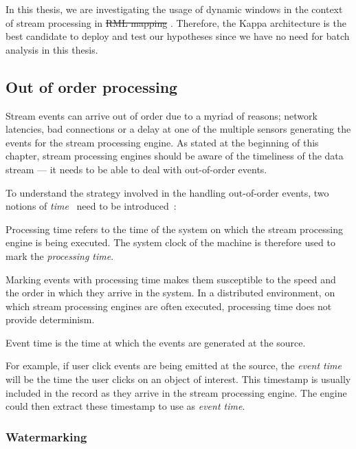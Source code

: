 In this thesis, we are investigating the usage of dynamic windows in the context of stream processing 
in \sout{RML mapping} . 
Therefore, the Kappa architecture is the best candidate to deploy and test our 
hypotheses since we have no need for batch analysis in this thesis.  

\subsection{Out of order processing}%
\label{sub:Out of order processing}
Stream events can arrive out of order due to a myriad of reasons; network latencies, 
bad connections or a delay at one of the multiple sensors generating the events for 
the stream processing engine. As stated at the beginning of this chapter, stream 
processing engines should be aware of the timeliness of the data stream --- it needs 
to be able to deal with out-of-order events. 

To understand the strategy involved in the handling out-of-order events, 
two notions of \emph{time}~ need to be introduced~\cite{watermark_flink}:  

\begin{defn}
    Processing time refers to the time of the system on which the stream processing 
    engine is being executed. The system clock of the machine is therefore used 
    to mark the \emph{processing time}. 
\end{defn}
Marking events with processing time makes them 
susceptible to the speed and the order in which they arrive in the system. 
In a distributed environment, on which stream processing engines are often 
executed, processing time does not provide determinism.


\begin{defn}
    Event time is the time at which the events are generated at the source.
\end{defn}
For example, if user click events are being emitted at the
source, the \emph{event time} will be the time the user clicks on an object of 
interest. This timestamp is usually included in the record as they arrive 
in the stream processing engine. The engine could then extract these 
timestamp to use as \emph{event time}. 


\subsubsection{Watermarking}%
\label{ssub:Watermarking}

